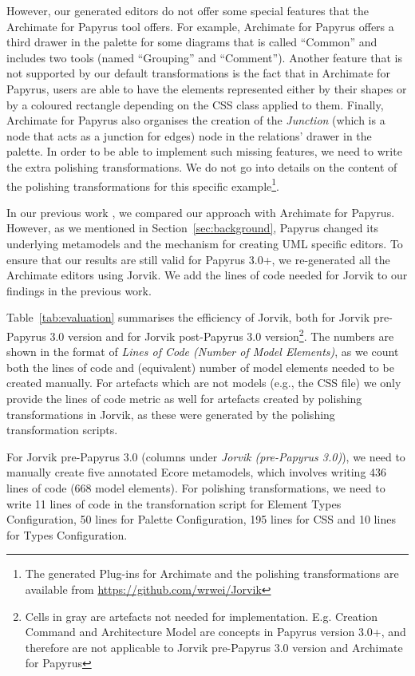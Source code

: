 However, our generated editors do not offer some special features that the Archimate for Papyrus tool offers. 
For example, Archimate for Papyrus offers a third drawer in the palette for some diagrams that is called ``Common'' and includes two tools (named ``Grouping'' and ``Comment''). 
Another feature that is not supported by our default transformations is the fact that in Archimate for Papyrus, users are able to have the elements represented either by their shapes or by a coloured rectangle depending on the CSS class applied to them. 
Finally, Archimate for Papyrus also organises the creation of the \textit{Junction} (which is a node that acts as a junction for edges) node in the relations' drawer in the palette.
In order to be able to implement such missing features, we need to write the extra polishing transformations. 
We do not go into details on the content of the polishing transformations for this specific example\footnote{The generated Plug-ins for Archimate and the polishing transformations are available from \url{https://github.com/wrwei/Jorvik}}.

In our previous work \cite{zolotas2018towards}, we compared our approach with Archimate for Papyrus. 
However, as we mentioned in Section~\ref{sec:background}, Papyrus changed its underlying metamodels and the mechanism for creating UML specific editors. 
To ensure that our results are still valid for Papyrus 3.0+, we re-generated all the Archimate editors using Jorvik. 
We add the lines of code needed for Jorvik to our findings in the previous work.

Table~\ref{tab:evaluation} summarises the efficiency of Jorvik, both for Jorvik pre-Papyrus 3.0 version and for Jorvik post-Papyrus 3.0 version\footnote{Cells in gray are artefacts not needed for implementation. E.g. Creation Command and Architecture Model are concepts in Papyrus version 3.0+, and therefore are not applicable to Jorvik pre-Papyrus 3.0 version and Archimate for Papyrus}. The numbers are shown in the format of \textit{Lines of Code (Number of Model Elements)}, as we count both the lines of code and (equivalent) number of model elements needed to be created manually. For artefacts which are not models (e.g., the CSS file) we only provide the lines of code metric as well for artefacts created by polishing transformations in Jorvik, as these were generated by the polishing transformation scripts.

For Jorvik pre-Papyrus 3.0 (columns under \textit{Jorvik (pre-Papyrus 3.0)}), we need to manually create five annotated Ecore metamodels, which involves writing 436 lines of code (668 model elements). 
For polishing transformations, we need to write 11 lines of code in the transfornation script for Element Types Configuration, 50 lines for Palette Configuration, 195 lines for CSS and 10 lines for Types Configuration.


